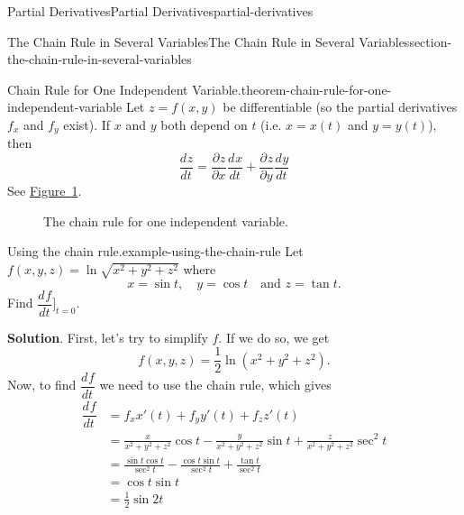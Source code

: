 \documentclass[oneside,10pt,]{book}
\numberwithin{equation}{section}
\newcommand{\dv}[3][]{\dfrac{d^{#1} #2}{d #3^{#1}}}
\newcommand{\pdv}[3][]{\dfrac{\partial^{#1} #2}{\partial #3^{#1}}}
\begin{document}
\begin{chapterptx}{Partial Derivatives}{}{Partial Derivatives}{}{}{partial-derivatives}
\begin{sectionptx}{The Chain Rule in Several Variables}{}{The Chain Rule in Several Variables}{}{}{section-the-chain-rule-in-several-variables}
\begin{theorem}{Chain Rule for One Independent Variable.}{}{theorem-chain-rule-for-one-independent-variable}%
\hypertarget{p-1388}{}%
Let \(z = f(x,y)\) be differentiable (so the partial derivatives \(f_{x}\) and \(f_{y}\) exist). If \(x\) and \(y\) both depend on \(t\) (i.e. \(x = x(t)\) and \(y = y(t)\)), then%
\begin{equation*}
\dv{z}{t} = \pdv{z}{x}\dv{x}{t} + \pdv{z}{y}\dv{y}{t}
\end{equation*}
See \hyperref[figure-chain-rule-one-independent-variable]{Figure~\ref{figure-chain-rule-one-independent-variable}}.%
\end{theorem}
\begin{figure}
\centering
{
}
\caption{The chain rule for one independent variable.\label{figure-chain-rule-one-independent-variable}}
\end{figure}
\begin{example}{Using the chain rule.}{example-using-the-chain-rule}%
\hypertarget{p-1389}{}%
Let \(f(x,y,z) = \ln\sqrt{x^{2}+y^{2}+z^{2}}\) where%
\begin{equation*}
x = \sin t,\quad y = \cos t\quad\text{and } z = \tan t.
\end{equation*}
Find \(\dv{f}{t}\bigg]_{t=0}\).%
\par\smallskip%
\noindent\textbf{Solution}.\hypertarget{solution-224}{}\quad%
\hypertarget{p-1390}{}%
First, let's try to simplify \(f\). If we do so, we get%
\begin{equation*}
f(x,y,z) = \frac{1}{2}\ln(x^{2} + y^{2} + z^{2}).
\end{equation*}
Now, to find \(\dv{f}{t}\) we need to use the chain rule, which gives%
\begin{align*}
\dv{f}{t} & = f_{x}x'(t) + f_{y}y'(t) + f_{z}z'(t) \\
& = \frac{x}{x^{2} + y^{2} + z^{2}}\cos t  - \frac{y}{x^{2} + y^{2} + z^{2}}\sin t + \frac{z}{x^{2} + y^{2} + z^{2}}\sec^{2}t\\
& = \frac{\sin t\cos t}{\sec^{2}t} - \frac{\cos t\sin t}{\sec^{2}t} + \frac{\tan t}{\sec^{2}t}\\
& = \cos t\sin t \\
& = \frac{1}{2}\sin2t 
\end{align*}

\end{example}
\end{sectionptx}
\end{chapterptx}
\end{document}
